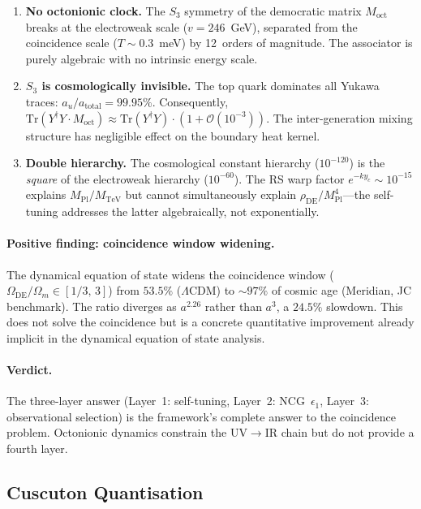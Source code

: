 \begin{enumerate}
  \item \textbf{No octonionic clock.} The $S_3$ symmetry of the democratic matrix $M_{\mathrm{oct}}$ breaks at the electroweak scale ($v = 246$~GeV), separated from the coincidence scale ($T \sim 0.3$~meV) by 12~orders of magnitude. The associator is purely algebraic with no intrinsic energy scale.
  \item \textbf{$S_3$ is cosmologically invisible.} The top quark dominates all Yukawa traces: $a_u/a_{\mathrm{total}} = 99.95\%$. Consequently, $\mathrm{Tr}(Y^\dagger Y \cdot M_{\mathrm{oct}}) \approx \mathrm{Tr}(Y^\dagger Y)\cdot(1 + \mathcal{O}(10^{-3}))$. The inter-generation mixing structure has negligible effect on the boundary heat kernel.
  \item \textbf{Double hierarchy.} The cosmological constant hierarchy ($10^{-120}$) is the \emph{square} of the electroweak hierarchy ($10^{-60}$). The RS warp factor $e^{-k y_c} \sim 10^{-15}$ explains $M_{\mathrm{Pl}}/M_{\mathrm{TeV}}$ but cannot simultaneously explain $\rho_{\mathrm{DE}}/M_{\mathrm{Pl}}^4$---the self-tuning addresses the latter algebraically, not exponentially.
\end{enumerate}

\paragraph{Positive finding: coincidence window widening.} The dynamical equation of state widens the coincidence window ($\Omega_{\mathrm{DE}}/\Omega_m \in [1/3,\, 3]$) from $53.5\%$ ($\Lambda$CDM) to ${\sim}\!97\%$ of cosmic age (Meridian, JC benchmark). The ratio diverges as $a^{2.26}$ rather than $a^3$, a $24.5\%$ slowdown. This does not solve the coincidence but is a concrete quantitative improvement already implicit in the dynamical equation of state analysis.

\paragraph{Verdict.} The three-layer answer (Layer~1: self-tuning, Layer~2: NCG~$\epsilon_1$, Layer~3: observational selection) is the framework's complete answer to the coincidence problem. Octonionic dynamics constrain the UV$\to$IR chain but do not provide a fourth layer.

\subsection{Cuscuton Quantisation}

